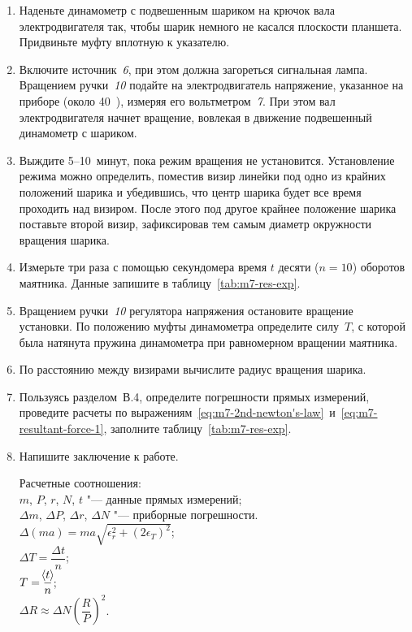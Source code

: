 \documentclass[a4paper, 12pt]{extarticle}
\newcommand{\eps}{\epsilon}
\begin{document}
\begin{enumerate}
\item Наденьте динамометр с подвешенным шариком на крючок вала электродвигателя так, чтобы шарик немного не касался плоскости планшета. Придвиньте муфту вплотную к указателю.
\item Включите источник~\emph{6}, при этом должна загореться сигнальная лампа.  Вращением ручки~\emph{10} подайте на электродвигатель напряжение, указанное на приборе (около 40~), измеряя его вольтметром~\emph{7}. При этом вал электродвигателя начнет вращение, вовлекая в движение подвешенный динамометр с шариком.
\item Выждите 5--10~минут, пока режим вращения не установится. Установление режима можно определить, поместив визир линейки под одно из крайних положений шарика и убедившись, что центр шарика будет все время проходить над визиром. После этого под другое крайнее положение шарика поставьте второй визир, зафиксировав тем самым диаметр окружности вращения шарика. 
\item Измерьте три раза с помощью секундомера время $t$ десяти ($n = 10$) оборотов маятника. Данные запишите в таблицу~\ref{tab:m7-res-exp}.
\item Вращением ручки~\emph{10} регулятора напряжения остановите вращение установки. По положению муфты динамометра определите силу~$T$, с которой была натянута пружина динамометра при равномерном вращении маятника. 
\item По расстоянию между визирами вычислите радиус вращения шарика.
\item Пользуясь разделом~В.4, определите погрешности прямых измерений, проведите расчеты по выражениям~\eqref{eq:m7-2nd-newton's-law}~и~\eqref{eq:m7-resultant-force-1}, заполните таблицу~\ref{tab:m7-res-exp}. 
\item Напишите заключение к работе.

Расчетные соотношения:\\ %
$m$, $P$, $r$, $N$, $t$ "--- данные прямых измерений; \\
$\Delta m$, $\Delta P$, $\Delta r$, $\Delta N$ "--- приборные погрешности. \\ %
$\Delta (ma) = ma\sqrt{\eps_r^2 + (2\eps_T)^2}$; \\ %
$\Delta T = \dfrac{\Delta t}{n}$; \\
$T = \dfrac{\hspace{-3pt}\left<t\right>\hspace{-3pt}}{n}$; \\
$\Delta R \approx \Delta N \left(\dfrac{R}{P}\right)^2$.
\end{enumerate}
\end{document}
